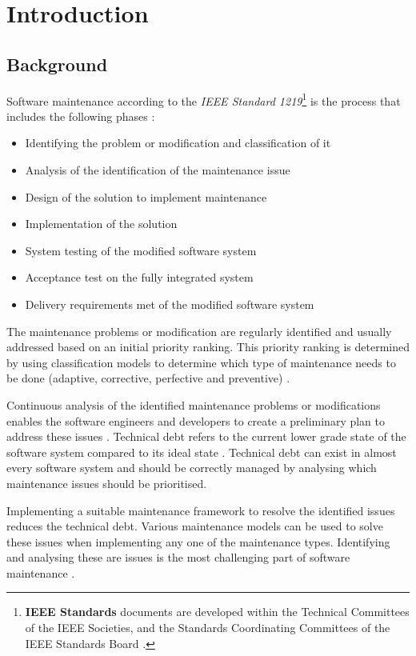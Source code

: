 \chapter{Introduction}
\label{chap:1}

\section{Background}\label{section:background}

Software maintenance according to the \textit{IEEE Standard 1219}\footnote{\textbf{IEEE Standards} documents are developed within the Technical Committees of the IEEE Societies, and the Standards Coordinating Committees of the IEEE Standards Board \cite{Mamone1994}.} is the process that includes the following phases \cite{Mamone1994, Hasan2012}:
\begin{itemize}
	\item Identifying the problem or modification and classification of it
	\item Analysis of the identification of the maintenance issue
	\item Design of the solution to implement maintenance
	\item Implementation of the solution
	\item System testing of the modified software system
	\item Acceptance test on the fully integrated system
	\item Delivery requirements met of the modified software system
\end{itemize}

The maintenance problems or modification are regularly identified and usually addressed based on an initial priority ranking. This priority ranking is determined by using classification models to determine which type of maintenance needs to be done (adaptive, corrective, perfective and preventive) \cite{Tang2010,Mamone1994,Ping2010}.\par Continuous analysis of the identified maintenance problems or modifications enables the software engineers and developers to create a preliminary plan to address these issues \cite{Port2017}. Technical debt refers to the current lower grade state of the software system compared to its ideal state \cite{DeLeon-Sigg2020, Reimanis2016}. Technical debt can exist in almost every software system and should be correctly managed by analysing which maintenance issues should be prioritised.\par Implementing a suitable maintenance framework to resolve the identified issues reduces the technical debt. Various maintenance models can be used to solve these issues when implementing any one of the maintenance types. Identifying and analysing these are issues is the most challenging part of software maintenance \cite{DeLeon-Sigg2020}.

